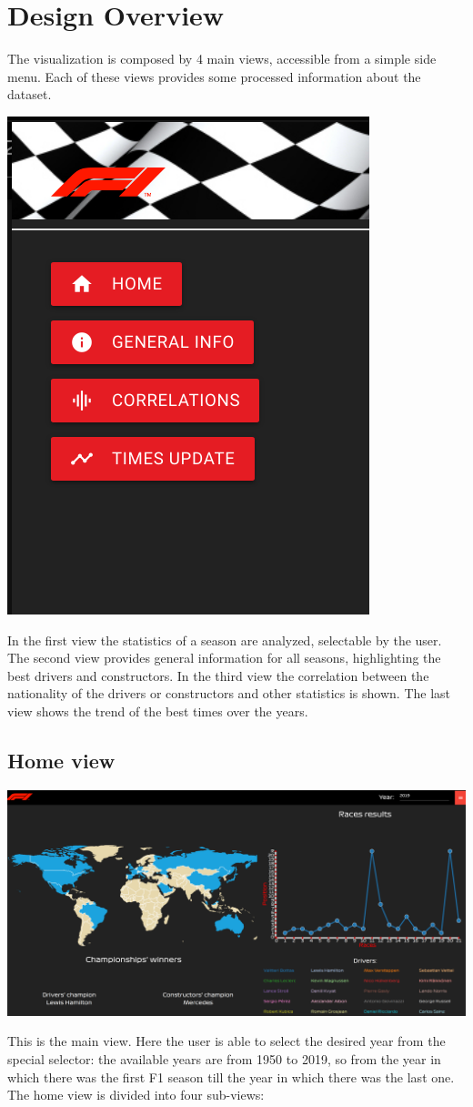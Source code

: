 \documentclass[11pt,twocolumn,letterpaper]{article}
\begin{document}
\section{Design Overview}
The visualization is composed by 4 main views, accessible from a simple side menu. Each of these views provides some processed information about the dataset.
\begin{center}
	\centering
	\includegraphics[width=0.3\columnwidth]{menu}
\end{center}
In the first view the statistics of a season are analyzed, selectable by the user. The second view provides general information for all seasons, highlighting the best drivers and constructors. In the third view the correlation between the nationality of the drivers or constructors and other statistics is shown. The last view shows the trend of the best times over the years.

\subsection{Home view}
\begin{center}
	\centering
	\includegraphics[width=\columnwidth]{home}
\end{center}

This is the main view. Here the user is able to select the desired year from the special selector: the available years are from 1950 to 2019, so from the year in which there was
the first F1 season till the year in which there was the last one. The home view is divided into four sub-views:
\end{document}
